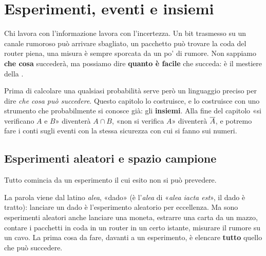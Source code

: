 \chapter{Esperimenti, eventi e insiemi}

Chi lavora con l'informazione lavora con l'incertezza. Un bit trasmesso su un canale rumoroso può arrivare sbagliato,
un pacchetto può trovare la coda del router piena, una misura è sempre sporcata da un po' di rumore. Non sappiamo
\textbf{che cosa} succederà, ma possiamo dire \textbf{quanto è facile} che succeda: è il mestiere della
.

Prima di calcolare una qualsiasi probabilità serve però un linguaggio preciso per dire \emph{che cosa può succedere}.
Questo capitolo lo costruisce, e lo costruisce con uno strumento che probabilmente si conosce già: gli
\textbf{insiemi}. Alla fine del capitolo «si verificano $A$ e $B$» diventerà $A \cap B$, «non si verifica $A$»
diventerà $\overline{A}$, e potremo fare i conti sugli eventi con la stessa sicurezza con cui si fanno sui numeri.

\section{Esperimenti aleatori e spazio campione}

Tutto comincia da un esperimento il cui esito non si può prevedere.


La parola viene dal latino \emph{alea}, «dado» (è l'\emph{alea} di «\emph{alea iacta est}», il dado è tratto): lanciare
un dado è l'esperimento aleatorio per eccellenza. Ma sono esperimenti aleatori anche lanciare una moneta, estrarre una
carta da un mazzo, contare i pacchetti in coda in un router in un certo istante, misurare il rumore su un cavo.
La prima cosa da fare, davanti a un esperimento, è elencare \textbf{tutto} quello che può succedere.


